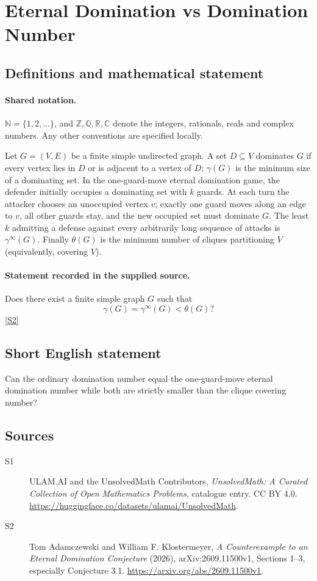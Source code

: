 \documentclass[11pt]{article}
\newcommand{\sref}[2]{\hyperlink{source:#1:#2}{[S#2]}}
\begin{document}
\section{Eternal Domination vs Domination Number}\label{statement}

\subsection{Definitions and mathematical statement}

\paragraph{Shared notation.}$\mathbb N=\{1,2,\ldots\}$, and $\mathbb Z,\mathbb Q,\mathbb R,\mathbb C$ denote the integers, rationals, reals and complex numbers. Any other conventions are specified locally.


Let $G=(V,E)$ be a finite simple undirected graph. A set $D\subseteq V$ dominates $G$ if every vertex lies in $D$ or is adjacent to a vertex of $D$; $\gamma(G)$ is the minimum size of a dominating set. In the one-guard-move eternal domination game, the defender initially occupies a dominating set with $k$ guards. At each turn the attacker chooses an unoccupied vertex $v$; exactly one guard moves along an edge to $v$, all other guards stay, and the new occupied set must dominate $G$. The least $k$ admitting a defense against every arbitrarily long sequence of attacks is $\gamma^\infty(G)$. Finally $\theta(G)$ is the minimum number of cliques partitioning $V$ (equivalently, covering $V$).
\paragraph{Statement recorded in the supplied source.}
Does there exist a finite simple graph $G$ such that
\[
 \gamma(G)=\gamma^\infty(G)<\theta(G)?
\]
\sref{statement}{2}
\subsection{Short English statement}
Can the ordinary domination number equal the one-guard-move eternal domination number while both are strictly smaller than the clique covering number?
\subsection{Sources}
\begin{description}
\item[\hypertarget{source:statement:1}{S1}] ULAM.AI and the UnsolvedMath Contributors, \emph{UnsolvedMath: A Curated Collection of Open Mathematics Problems}, catalogue entry. CC BY 4.0. \url{https://huggingface.co/datasets/ulamai/UnsolvedMath}.
\item[\hypertarget{source:statement:2}{S2}] Tom Adamczewski and William F. Klostermeyer, \emph{A Counterexample to an Eternal Domination Conjecture} (2026), arXiv:2609.11500v1, Sections 1--3, especially Conjecture 3.1. \url{https://arxiv.org/abs/2609.11500v1}.
\end{description}
\label{end:statement}
\end{document}
